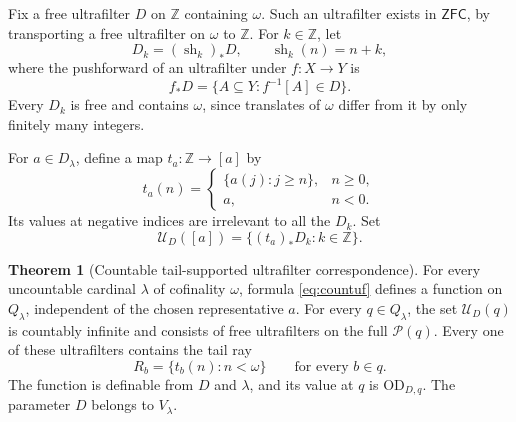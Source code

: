 \documentclass[11pt,letterpaper]{article}
\theoremstyle{definition}
\newtheorem{theorem}[definition]{Theorem}
\numberwithin{equation}{section}
\newcommand{\ZFC}{\mathsf{ZFC}}
\newcommand{\OD}{\mathrm{OD}}
\newcommand{\Pow}{\mathcal P}
\newcommand{\sh}{\operatorname{sh}}
\begin{document}
Fix a free ultrafilter $D$ on $\mathbb Z$ containing $\omega$. Such an
ultrafilter exists in $\ZFC$, by transporting a free ultrafilter on $\omega$
to $\mathbb Z$. For $k\in\mathbb Z$, let
\[
      D_k=(\sh_k)_*D,\qquad \sh_k(n)=n+k,
\]
where the pushforward of an ultrafilter under $f:X\to Y$ is
\[
                         f_*D=\{A\subseteq Y:f^{-1}[A]\in D\}.
\]
Every $D_k$ is free and contains $\omega$, since translates of $\omega$
differ from it by only finitely many integers.

For $a\in D_\lambda$, define a map $t_a:\mathbb Z\to[a]$ by
\[
 t_a(n)=\begin{cases}
           \{a(j):j\ge n\},&n\ge0,\\
           a,&n<0.
         \end{cases}
\]
Its values at negative indices are irrelevant to all the $D_k$. Set
\begin{equation}\label{eq:countuf}
                  \mathscr U_D([a])=
                         \{(t_a)_*D_k:k\in\mathbb Z\}.
\end{equation}

\begin{theorem}[Countable tail-supported ultrafilter correspondence]
\label{thm:countuf}
For every uncountable cardinal $\lambda$ of cofinality $\omega$, formula
\eqref{eq:countuf} defines a function on $Q_\lambda$, independent of the
chosen representative $a$. For every $q\in Q_\lambda$, the set
$\mathscr U_D(q)$ is countably infinite and consists of free ultrafilters
on the full $\Pow(q)$. Every one of these ultrafilters contains the tail
ray
\[
                       R_b=\{t_b(n):n<\omega\}
                       \qquad\text{for every }b\in q.
\]
The function is definable from $D$ and $\lambda$, and its value at $q$ is
$\OD_{D,q}$. The parameter $D$ belongs to $V_\lambda$.
\end{theorem}
\end{document}
